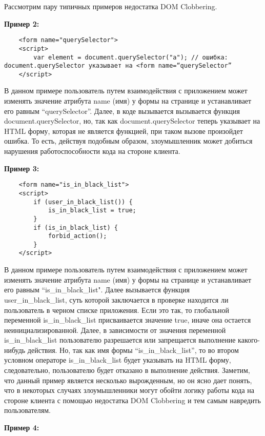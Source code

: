 Рассмотрим пару типичных примеров недостатка DOM Clobbering.

\bigskip
\textbf{Пример 2:}


\begin{lstlisting}
	<form name="querySelector">
	<script>
		var element = document.querySelector("a"); // ошибка: document.querySelector указывает на <form name=“querySelector”
	</script>
\end{lstlisting}
\bigskip

В данном примере пользователь путем взаимодействия с приложением может изменять значение атрибута name (имя) у формы на странице и устанавливает его равным “querySelector”. Далее, в коде вызывается вызывается функция document.querySelector, но, так как document.querySelector теперь указывает на HTML форму, которая не является функцией, при таком вызове произойдет ошибка.
То есть, действуя подобным образом, злоумышленник может добиться нарушения работоспособности кода на стороне клиента.

\bigskip
\textbf{Пример 3:}

\begin{lstlisting}
	<form name="is_in_black_list">
	<script>
		if (user_in_black_list()) {
			is_in_black_list = true;
		}
		if (is_in_black_list) {
			forbid_action();
		}
	</script>
\end{lstlisting}
\bigskip

В данном примере пользователь путем взаимодействия с приложением может изменять значение атрибута name (имя) у формы на странице и устанавливает его равным “is\_in\_black\_list". Далее вызывается функция \\user\_in\_black\_list, суть которой заключается в проверке находится ли пользователь в черном списке приложения. Если это так, то глобальной переменной is\_in\_black\_list присваивается значение true, иначе она остается неинициализированной. Далее, в зависимости от значения переменной is\_in\_black\_list пользователю разрешается или запрещается выполнение какого-нибудь действия. Но, так как имя формы  “is\_in\_black\_list”, то во втором условном операторе is\_in\_black\_list будет указывать на HTML форму, следовательно, пользователю будет отказано в выполнение действия.
Заметим, что данный пример является несколько вырожденным, но он ясно дает понять, что в некоторых случаях злоумышленники могут обойти логику работы кода на стороне клиента с помощью недостатка DOM Clobbering и тем самым навредить пользователям.

\bigskip
\textbf{Пример 4:}

